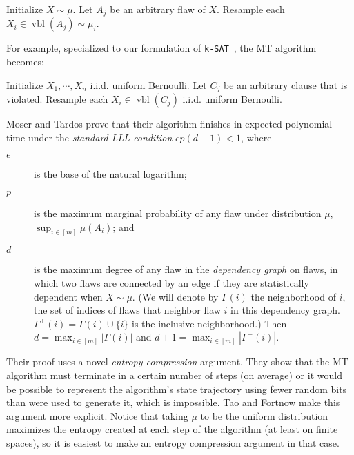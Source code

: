 \documentclass[twocolumn]{article}
\newcommand{\ksat}{\texttt{k-SAT}~}
\newcommand{\hasDist}%
  {\sim}
\begin{document}
\begin{algorithm}[H]
\caption{The Moser-Tardos (MT) algorithm, in simple iterative form.}
\label{alg:mt}
\begin{algorithmic}
  \State Initialize $X \hasDist \mu$.
    \State Let $A_j$ be an arbitrary flaw of $X$.
    \State Resample each $X_i \in \operatorname{vbl}(A_j) \hasDist \mu_i$.
  \EndWhile
\EndFunction
\end{algorithmic}
\end{algorithm}

For example, specialized to our formulation of \ksat, the MT algorithm becomes:

\begin{algorithm}[H]
\caption{The Moser-Tardos algorithm, specialized to \ksat.}
\label{alg:mt-ksat}
\begin{algorithmic}[1]
  \State Initialize $X_1, \cdots, X_n$ i.i.d. uniform Bernoulli.
    \State Let $C_j$ be an arbitrary clause that is violated.
    \State Resample each $X_i \in \operatorname{vbl}(C_j)$ i.i.d. uniform Bernoulli.
  \EndWhile
\EndFunction

\end{algorithmic}
\end{algorithm}

Moser and Tardos prove that their algorithm finishes in expected polynomial time under the \emph{standard LLL condition} $e p (d+1) < 1$, where
\begin{description}
  \item[$e$] is the base of the natural logarithm;
  \item[$p$] is the maximum marginal probability of any flaw under distribution $\mu$, $\sup_{i \in [m]} \mu(A_i)$; and
  \item[$d$] is the maximum degree of any flaw in the \emph{dependency graph} on flaws, in which two flaws are connected by an edge if they are statistically dependent when $X \hasDist \mu$.  (We will denote by $\Gamma(i)$ the neighborhood of $i$, the set of indices of flaws that neighbor flaw $i$ in this dependency graph.  $\Gamma^{+}(i) = \Gamma(i) \cup \{i\}$ is the inclusive neighborhood.)  Then $d = \max_{i \in [m]} |\Gamma(i)|$ and $d+1 = \max_{i \in [m]} |\Gamma^{+}(i)|$.
\end{description}

Their proof uses a novel \emph{entropy compression} argument.  They show that the MT algorithm must terminate in a certain number of steps (on average) or it would be possible to represent the algorithm's state trajectory using fewer random bits than were used to generate it, which is impossible.  Tao \cite{tao2009entropy} and Fortnow \cite{fortnow2009entropy} make this argument more explicit.  Notice that taking $\mu$ to be the uniform distribution maximizes the entropy created at each step of the algorithm (at least on finite spaces), so it is easiest to make an entropy compression argument in that case.
\end{document}
